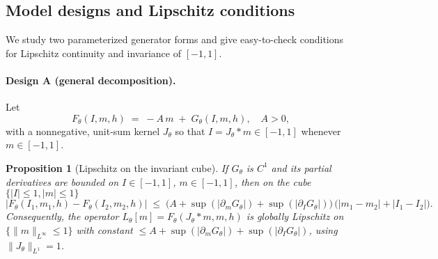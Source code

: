 \documentclass[11pt,a4paper]{article}
\theoremstyle{plain}
\newtheorem{proposition}[theorem]{Proposition}
\theoremstyle{definition}
\theoremstyle{remark}
\begin{document}


\subsection{Model designs and Lipschitz conditions}
\label{subsec:designs_lipschitz}

We study two parameterized generator forms and give easy-to-check conditions for Lipschitz continuity and invariance of $[-1,1]$.

\paragraph{Design A (general decomposition).} Let
\[
	F_\theta(I,m,h) \;=\; -A\,m \; +\; G_\theta(I,m,h),\quad A>0,
\]
with a nonnegative, unit-sum kernel $J_\theta$ so that $I=J_\theta * m\in[-1,1]$ whenever $m\in[-1,1]$.

\begin{proposition}[Lipschitz on the invariant cube]
	\label{prop:designA_lip}
	If $G_\theta$ is $C^1$ and its partial derivatives are bounded on $I\in[-1,1]$, $m\in[-1,1]$, then on the cube $\{|I|\le1,|m|\le1\}$
	\[
		\big|F_\theta(I_1,m_1,h)-F_\theta(I_2,m_2,h)\big|
		\;\le\; \Big(A + \sup(|\partial_m G_\theta|) + \sup(|\partial_I G_\theta|)\Big)\,\big(|m_1-m_2|+|I_1-I_2|\big).
	\]
	Consequently, the operator $L_\theta[m]=F_\theta(J_\theta*m,m,h)$ is globally Lipschitz on $\{\|m\|_{L^\infty}\le1\}$ with constant $\le A+\sup(|\partial_m G_\theta|)+\sup(|\partial_I G_\theta|)$, using $\|J_\theta\|_{L^1}=1$.
\end{proposition}
\end{document}
